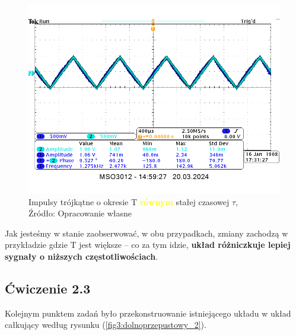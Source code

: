 \documentclass{article}
\begin{document}
        \begin{figure}[!ht]
          \centering
          \includegraphics[scale=0.25]{grafiki/T_T.png}
          \caption{Impulsy trójkątne o okresie T \textbf{\textcolor{yellow}{równym}} stałej czasowej $\tau$,
              \\Źródło: Opracowanie własne}
        \end{figure}

        Jak jesteśmy w stanie zaobserwować, w obu przypadkach, zmiany zachodzą w przykładzie gdzie T jest większe -- co za tym idzie, \textbf{układ różniczkuje lepiej sygnały o niższych częstotliwościach}.
        \pagebreak
    \subsection{Ćwiczenie 2.3}
      Kolejnym punktem zadań było przekonstruowanie istniejącego układu w układ całkujący według rysunku (\ref{fig3:dolnoprzepustowy_2}).
\end{document}

